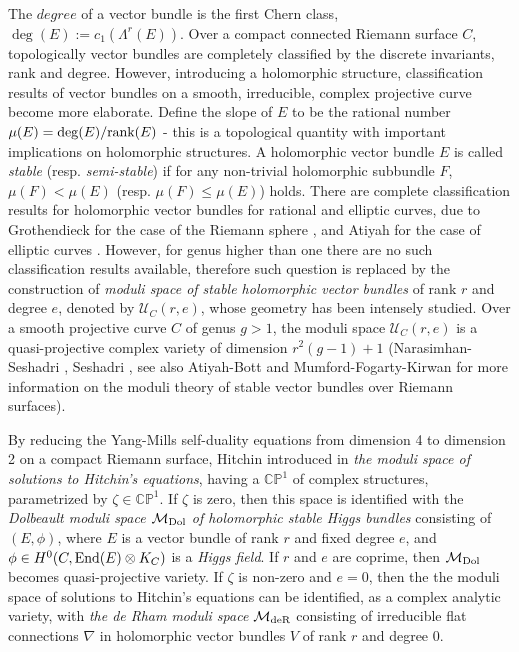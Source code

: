 \documentclass[oneside, 11pt]{amsart}
\theoremstyle{definition}
\numberwithin{equation}{subsection}
\def\End{{\text{\rm{End}}}}
\def\tensor{\otimes}
\def\Dol{{\text{\rm{Dol}}}}
\def\deR{{\text{\rm{deR}}}}
\def\rank{{\text{\rm{rank}}}}
\begin{document}
The $degree$ of a vector bundle is the first Chern class, $\deg(E):=c_1(\Lambda^r(E))$. Over a compact connected Riemann surface $C$, topologically vector bundles are completely classified by the discrete invariants, rank and degree. However, introducing a holomorphic structure, classification results of vector bundles on a smooth, irreducible, complex projective curve become more elaborate. Define the slope of $E$ to be the rational number $\mu(E)=\deg(E)/\rank(E)$ - this is a topological quantity with important implications on holomorphic structures. A holomorphic vector bundle $E$ is called \textit{stable} (resp. \emph{semi-stable}) if for any non-trivial holomorphic subbundle $F$,  $\mu(F)<\mu(E)$ (resp. $\mu(F)\leq \mu(E)$) holds.
There are complete classification results for holomorphic vector bundles for rational and elliptic curves, due to Grothendieck for the case of the Riemann sphere \cite{Gr}, and Atiyah for the case of elliptic curves \cite{At}. However, for genus higher than one there are no such classification results available, therefore such question is replaced by the construction of \textit{moduli space of 
stable holomorphic vector bundles} of rank $r$ and degree $e$, denoted by $\mathcal{U}_C(r,e)$, whose geometry has been  intensely studied. Over a smooth projective curve $C$ of genus $g>1$, the moduli space 
$\mathcal{U}_C(r,e)$ is a quasi-projective complex variety of dimension $r^2(g-1)+1$ (Narasimhan-Seshadri \cite{NS},   Seshadri \cite{Se}, see also 
Atiyah-Bott \cite{AB} and
Mumford-Fogarty-Kirwan \cite{MFK} for more information on the moduli theory of 
stable vector bundles over Riemann surfaces). 

By reducing the Yang-Mills self-duality equations from dimension 4 to dimension 2 on a compact Riemann surface, Hitchin introduced in \cite{H1} \textit{the moduli space of solutions to Hitchin's equations}, having a $\mathbb{CP}^1$ of complex structures, parametrized by $\zeta\in \mathbb{CP}^1$. If $\zeta$ is zero, then this space is identified with the \textit{Dolbeault moduli space $\mathcal{M}_{\Dol}$ of holomorphic stable Higgs bundles} 
consisting of $(E, \phi)$, where $E$ is a vector bundle of rank $r$ and fixed degree $e$, 
and $\phi\in H^0(C,\End  (E)\tensor K_C)$ is 
a \emph{Higgs field}.
 If $r$ and $e$ are coprime, then $\mathcal{M}_{\Dol}$ becomes quasi-projective variety. If $\zeta$ is non-zero and $e=0$, then the the moduli space of solutions to Hitchin's equations can be identified,
 as a complex analytic variety,
  with \textit{the de Rham moduli space 
  $\mathcal{M}_{\deR}$}
  consisting of irreducible flat connections $\nabla$
  in holomorphic vector bundles $V$ of rank $r$ and 
  degree $0$. 
\end{document}
